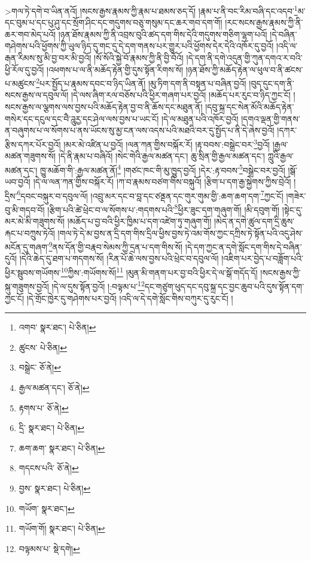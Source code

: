  >གལ་ཏེ་དགེ་བ་ཡིན་ནའོ། །སངས་རྒྱས་རྣམས་ཀྱི་རྣམ་པ་ཐམས་ཅད་དོ། །རྣམ་པ་ནི་བང་རིམ་བཞི་དང་འདབ་\footnote{འགབ་  སྣར་ཐང་།  པེ་ཅིན། }མ་དང་བུམ་པ་དང་པུ་ཤུ་དང་སྲོག་ཤིང་དང་གདུགས་བཅུ་གསུམ་དང་ཆར་གབ་དག་གོ། །རང་སངས་རྒྱས་རྣམས་ཀྱི་ནི་ཆར་གབ་མེད་པའོ། །ཉན་ཐོས་རྣམས་ཀྱི་ནི་འབྲས་བུའི་ཚད་དག་གིས་དེའི་གདུགས་གཅིག་ལྷག་པའོ། །དེ་བཞིན་གཤེགས་པའི་ཕྱོགས་ཀྱི་ཡུལ་ཉིད་དུ་གང་དུ་དེ་དག་གནས་པར་གྱུར་པའི་ཕྱོགས་དེར་དེའི་འཁོར་དུ་བྱའོ། །འདི་ལ་རྒན་རིམས་སུ་མི་བྱ་བར་མི་བྱའོ། །སོ་སོའི་སྐྱེ་བོ་རྣམས་ཀྱི་ནི་བྱི་བོའོ། །དེ་དག་ནི་དགེ་འདུན་གྱི་ཀུན་དགའ་ར་བའི་ཕྱི་རོལ་དུ་བྱའོ། །འཕགས་པ་ལ་ནི་མཆོད་རྟེན་གྱི་དུས་སྟོན་རིགས་སོ། །ཉན་ཐོས་ཀྱི་མཆོད་རྟེན་ལ་ཕུལ་བ་ནི་ཚངས་པ་མཚུངས་\footnote{ཚུངས་  པེ་ཅིན། }པར་སྤྱོད་པ་རྣམས་དབང་བ་ཉིད་ཡིན་ནོ། །མུ་ཏིག་དག་ནི་བསྟན་པ་བཞིན་བྱའོ། །བུད་དུང་དག་ནི་སངས་རྒྱས་ལ་དབུལ་ལོ། །དེ་ལས་ཞིག་རལ་བཅོས་པའི་ཕྱིར་གཞག་པར་བྱའོ། །མཆོད་པར་རུང་བ་ཉིད་ཀྱང་ངོ། །སངས་རྒྱས་ལ་ལྕགས་ལས་བྱས་པའི་མཆོད་རྟེན་བྱ་བ་ནི་ཆོས་དང་མཐུན་ནོ། །དབུ་སྐྲ་དང་སེན་མོའི་མཆོད་རྟེན་གསེར་དང་དངུལ་དང་བཻ་ཌཱུརྱ་དང་ཤེལ་ལས་བྱས་པ་ཡང་ངོ། །དེ་ལ་མཐུན་པའི་འཁོར་བྱའོ། །དགའ་ལྡན་གྱི་གནས་ན་བཞུགས་པ་ལ་སོགས་པ་ནས་ཡོངས་སུ་མྱ་ངན་ལས་འདས་པའི་མཐའི་བར་དུ་སྤྱོད་པ་ནི་དེ་ཞེས་བྱའོ། །དཀར་རྩིས་དཀར་པོར་བྱའོ། །མར་མེ་འཛིན་པ་བྱའོ། །ལན་ཀན་གྱིས་བསྐོར་རོ། །རྟ་བབས་:བསྒྲེང་བར་\footnote{བསྒྲེང་  ཅོ་ནེ། }བྱའོ། །རྒྱལ་མཚན་གཟུགས་སོ། །དེ་ནི་རྣམ་པ་བཞིའོ། །སེང་གེའི་རྒྱལ་མཚན་དང་། ཆུ་སྲིན་གྱི་རྒྱལ་མཚན་དང་། ཀླུའི་རྒྱལ་མཚན་དང་། ཁྱུ་མཆོག་གི་:རྒྱལ་མཚན་ནོ།\footnote{རྒྱལ་མཚན་དང་།  ཅོ་ནེ། } །གཙང་ཁང་གི་མུ་ཁྱུད་བྱའོ། །དེར་:རྟ་བབས་\footnote{རྟགས་པ་  ཅོ་ནེ། }བསྒྲེང་བར་བྱའོ། །སྒོ་ཡབ་བྱའོ། །དེ་ལ་ལན་ཀན་གྱིས་བསྐོར་རོ། །ཀ་བ་རྣམས་བཙག་གིས་བསྐུའོ། །རྩིག་པ་དག་རྒྱ་སྐྱེགས་ཀྱིས་བྲེའོ། །དྲིས་\footnote{དྲི་  སྣར་ཐང་།  པེ་ཅིན། }དབང་བསྐུར་བ་དབུལ་ལོ། །འབྲུ་མར་དང་བ་བླ་དང་ཙནྡན་དང་གུར་གུམ་གྱི་:ཆག་ཆག་དག་\footnote{ཆག་ཆག་  སྣར་ཐང་།  པེ་ཅིན། }ཀྱང་ངོ། །གཟེར་བུ་མི་གདབ་བོ། །རྩིག་པའི་ཚེ་ཕྲེང་བ་ལ་སོགས་པ་:གདགས་པའི་\footnote{གདངས་པའི་  ཅོ་ནེ། }ཕྱིར་ཟུང་དག་གཞུག་གོ། །མི་དབུག་གོ། །སྟེང་དུ་མར་མེ་མི་གཟུགས་སོ། །མཆོད་པ་བྱ་བའི་ཕྱིར་ཁྱིམ་པ་དག་འཛེག་ཏུ་གཞུག་གོ། །མེད་ན་དགེ་ཚུལ་དག་དྲི་ཆུས་རྐང་པ་བཀྲུས་ཏེའོ། །གལ་ཏེ་དེ་མ་བྱས་ན་དྲི་དག་གིས་དྲིལ་ཕྱིས་བྱས་ཏེ་འམ་གོས་ཀྱང་དཀྲིས་ཏེ་སྟོན་པའི་འདུ་ཤེས་མངོན་དུ་གཞག་\footnote{བྱས་  སྣར་ཐང་།  པེ་ཅིན། }ནས་དོན་གྱི་བརྣབ་སེམས་ཀྱི་དྲན་པ་དག་གིས་སོ། །དེ་དག་ཀྱང་ན་དགེ་སློང་དག་གིས་དེ་བཞིན་དུའོ། །དེའི་ཆེད་དུ་ཐག་པ་གདགས་སོ། །རིན་པོ་ཆེ་ལས་བྱས་པའི་ཕྲེང་བ་དབུལ་ལོ། །འཇིག་པར་བྱེད་པ་བཟློག་པའི་ཕྱིར་སྦུབས་གཡོགས་\footnote{གཡོག་  སྣར་ཐང་། }ཀྱིས་:གཡོགས་སོ།\footnote{གཡོག་གོ།  སྣར་ཐང་།  པེ་ཅིན། } །མུན་མི་གནག་པར་བྱ་བའི་ཕྱིར་དེ་ལ་སྒོ་གདོད་དོ། །སངས་རྒྱས་ཀྱི་སྐུ་གཟུགས་བྱའོ། །དེ་ལ་དུས་སྟོན་བྱའོ། །:བལྟམ་པ་\footnote{བལྟམས་པ་  སྡེ་དགེ། }དང་གཙུག་ཕུད་དང་དབུ་སྐྲ་དང་བྱང་ཆུབ་པའི་དུས་སྟོན་དག་ཀྱང་ངོ། །དེ་གྲོང་ཁྱེར་དུ་གཤེགས་པར་བྱའོ། །འདི་ལ་དེ་དགེ་སློང་གིས་བཀུར་དུ་རུང་ངོ། །
